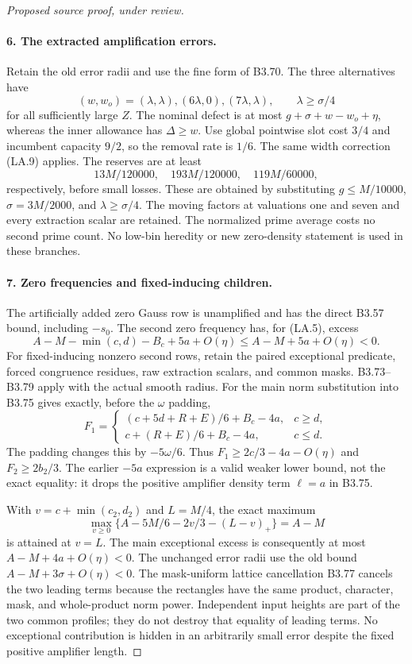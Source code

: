 \begin{proof}[Proposed source proof, under review]
\paragraph{6. The extracted amplification errors.}
Retain the old error radii and use the fine form of B3.70.
The three alternatives have
\[
 (w,w_o)=(\lambda,\lambda),(6\lambda,0),(7\lambda,\lambda),
 \qquad \lambda\ge\sigma/4
\]
for all sufficiently large $Z$. The nominal defect is at most
$g+\sigma+w-w_o+\eta$, whereas the inner allowance has
$\Delta\ge w$. Use global pointwise slot cost $3/4$ and incumbent
capacity $9/2$, so the removal rate is $1/6$. The same width
correction (LA.9) applies. The reserves are at least
\[
 13M/120000,\quad193M/120000,\quad119M/60000,
\]
respectively, before small losses. These are obtained by substituting
$g\le M/10000$, $\sigma=3M/2000$, and $\lambda\ge\sigma/4$.
The moving factors at valuations one and seven and every extraction
scalar are retained. The normalized prime average costs no second
prime count. No low-bin heredity or new zero-density statement is
used in these branches.

\paragraph{7. Zero frequencies and fixed-inducing children.}
The artificially added zero Gauss row is unamplified and has the
direct B3.57 bound, including $-s_0$. The second zero frequency
has, for (LA.5), excess
\[
 A-M-\min(c,d)-B_c+5a+O(\eta)\le A-M+5a+O(\eta)<0.
\]
For fixed-inducing nonzero second rows, retain the paired exceptional
predicate, forced congruence residues, raw extraction scalars, and
common masks. B3.73--B3.79 apply with the actual smooth radius.
For the main norm substitution into B3.75 gives exactly, before
the $\omega$ padding,
\[
 F_1=\begin{cases}
 (c+5d+R+E)/6+B_c-4a,&c\ge d,\\
 c+(R+E)/6+B_c-4a,&c\le d.
 \end{cases}
\]
The padding changes this by $-5\omega/6$. Thus
$F_1\ge2c/3-4a-O(\eta)$ and $F_2\ge2b_2/3$.
The earlier $-5a$ expression is a valid weaker lower bound, not
the exact equality: it drops the positive amplifier density term
$\ell=a$ in B3.75.

With $v=c+\min(c_2,d_2)$ and $L=M/4$, the exact maximum
\[
 \max_{v\ge0}\{A-5M/6-2v/3-(L-v)_+\}=A-M
\]
is attained at $v=L$. The main exceptional excess is consequently
at most $A-M+4a+O(\eta)<0$. The unchanged error radii use the
old bound $A-M+3\sigma+O(\eta)<0$. The mask-uniform lattice
cancellation B3.77 cancels the two leading terms because the
rectangles have the same product, character, mask, and whole-product
norm power. Independent input heights are part of the two common
profiles; they do not destroy that equality of leading terms.
No exceptional contribution is hidden in an arbitrarily small
error despite the fixed positive amplifier length.


\end{proof}
